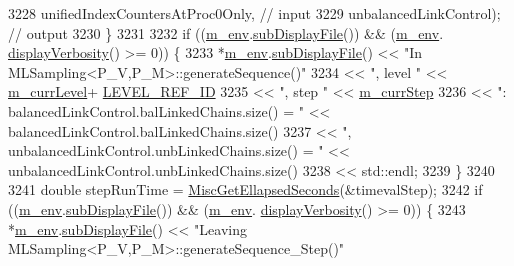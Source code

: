 \begin{DoxyCode}
3228                                       unifiedIndexCountersAtProc0Only, \textcolor{comment}{// input}
3229                                       unbalancedLinkControl);          \textcolor{comment}{// output}
3230       \}
3231 
3232       \textcolor{keywordflow}{if} ((\hyperlink{class_q_u_e_s_o_1_1_m_l_sampling_a13f1ca4fe9f94822fe572a743eaced1d}{m\_env}.\hyperlink{class_q_u_e_s_o_1_1_base_environment_a8a0064746ae8dddfece4229b9ad374d6}{subDisplayFile}()) && (\hyperlink{class_q_u_e_s_o_1_1_m_l_sampling_a13f1ca4fe9f94822fe572a743eaced1d}{m\_env}.
      \hyperlink{class_q_u_e_s_o_1_1_base_environment_a1fe5f244fc0316a0ab3e37463f108b96}{displayVerbosity}() >= 0)) \{
3233         *\hyperlink{class_q_u_e_s_o_1_1_m_l_sampling_a13f1ca4fe9f94822fe572a743eaced1d}{m\_env}.\hyperlink{class_q_u_e_s_o_1_1_base_environment_a8a0064746ae8dddfece4229b9ad374d6}{subDisplayFile}() << \textcolor{stringliteral}{"In MLSampling<P\_V,P\_M>::generateSequence()"}
3234                                 << \textcolor{stringliteral}{", level "} << \hyperlink{class_q_u_e_s_o_1_1_m_l_sampling_af9416874c856e50f3b35270e801f17e4}{m\_currLevel}+
      \hyperlink{_m_l_sampling_level_options_8h_a68d15eaf394d210effcf584b938206d3}{LEVEL\_REF\_ID}
3235                                 << \textcolor{stringliteral}{", step "}  << \hyperlink{class_q_u_e_s_o_1_1_m_l_sampling_a1b1f8ccb4823bdfa26ec652f0807c63e}{m\_currStep}
3236                                 << \textcolor{stringliteral}{": balancedLinkControl.balLinkedChains.size() = "}   << 
      balancedLinkControl.balLinkedChains.size()
3237                                 << \textcolor{stringliteral}{", unbalancedLinkControl.unbLinkedChains.size() = "} << 
      unbalancedLinkControl.unbLinkedChains.size()
3238                                 << std::endl;
3239       \}
3240 
3241   \textcolor{keywordtype}{double} stepRunTime = \hyperlink{namespace_q_u_e_s_o_a424bc33f2e6e287fd468408d14b772ee}{MiscGetEllapsedSeconds}(&timevalStep);
3242   \textcolor{keywordflow}{if} ((\hyperlink{class_q_u_e_s_o_1_1_m_l_sampling_a13f1ca4fe9f94822fe572a743eaced1d}{m\_env}.\hyperlink{class_q_u_e_s_o_1_1_base_environment_a8a0064746ae8dddfece4229b9ad374d6}{subDisplayFile}()) && (\hyperlink{class_q_u_e_s_o_1_1_m_l_sampling_a13f1ca4fe9f94822fe572a743eaced1d}{m\_env}.
      \hyperlink{class_q_u_e_s_o_1_1_base_environment_a1fe5f244fc0316a0ab3e37463f108b96}{displayVerbosity}() >= 0)) \{
3243     *\hyperlink{class_q_u_e_s_o_1_1_m_l_sampling_a13f1ca4fe9f94822fe572a743eaced1d}{m\_env}.\hyperlink{class_q_u_e_s_o_1_1_base_environment_a8a0064746ae8dddfece4229b9ad374d6}{subDisplayFile}() << \textcolor{stringliteral}{"Leaving MLSampling<P\_V,P\_M>::generateSequence\_Step()"}

\end{DoxyCode}
